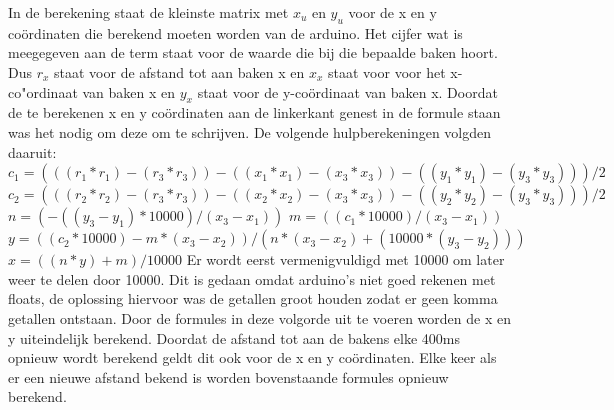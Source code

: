 \documentclass{article}
\begin{document}
In de berekening staat de kleinste matrix met $x_u$ en $y_u$ voor de x en y co\"{o}rdinaten die berekend moeten worden van de arduino. Het cijfer wat is meegegeven aan de term staat voor de waarde die bij die bepaalde baken hoort. Dus $r_x$ staat voor de afstand tot aan baken x en $x_x$ staat voor voor het x-co"{o}rdinaat van baken x en $y_x$ staat voor de y-co\"{o}rdinaat van baken x. Doordat de te berekenen x en y co\"{o}rdinaten aan de linkerkant genest in de formule staan was het nodig om deze om te schrijven. De volgende hulpberekeningen volgden daaruit: \newline
$c_1 = (((r_1*r_1)-(r_3*r_3))-((x_1*x_1)-(x_3*x_3))-((y_1*y_1)-(y_3*y_3)))/2 $
\newline
\newline
$c_2 = (((r_2*r_2)-(r_3*r_3))-((x_2*x_2)-(x_3*x_3))-((y_2*y_2)-(y_3*y_3)))/2 $
\newline
\newline
$n =(-((y_3-y_1)*10000)/(x_3-x_1)) $
\newline
\newline
$m = ((c_1*10000)/(x_3-x_1)) $
\newline
\newline
$y = ((c_2*10000) - m*(x_3-x_2))/(n*(x_3-x_2) + (10000*(y_3-y_2))) $
\newline
\newline
$x = ((n*y)+m)/10000 $
\newline
\newline
Er wordt eerst vermenigvuldigd met 10000 om later weer te delen door 10000. Dit is gedaan omdat arduino's niet goed rekenen met floats, de oplossing hiervoor was de getallen groot houden zodat er geen komma getallen ontstaan. 
Door de formules in deze volgorde uit te voeren worden de x en y uiteindelijk berekend. Doordat de afstand tot aan de bakens elke 400ms opnieuw wordt berekend geldt dit ook voor de x en y co\"{o}rdinaten. Elke keer als er een nieuwe afstand bekend is worden bovenstaande formules opnieuw berekend. 
\end{document}
